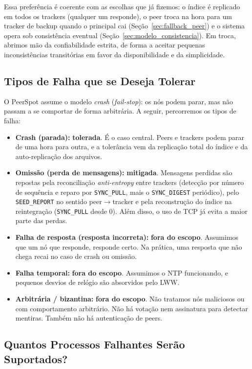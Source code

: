 \documentclass[12pt, a4paper]{article}
\begin{document}
Essa preferência é coerente com as escolhas que já fizemos: o índice é replicado em todos os trackers (qualquer um responde), o peer troca na hora para um tracker de backup quando o principal cai (Seção~\ref{sec:fallback_peer}) e o sistema opera sob consistência eventual (Seção~\ref{sec:modelo_consistencia}). Em troca, abrimos mão da confiabilidade estrita, de forma a aceitar pequenas inconsistências transitórias em favor da disponibilidade e da simplicidade.

\subsection{Tipos de Falha que se Deseja Tolerar}\label{sec:tipos-falha}

O PeerSpot assume o modelo \textit{crash} (\textit{fail-stop}): os nós podem parar, mas não passam a se comportar de forma arbitrária. A seguir, percorremos os tipos de falha:

\begin{itemize}
    \item \textbf{Crash (parada):} \textbf{tolerada}. É o caso central. Peers e trackers podem parar de uma hora para outra, e a tolerância vem da replicação total do índice e da auto-replicação dos arquivos.
    \item \textbf{Omissão (perda de mensagens):} \textbf{mitigada}. Mensagens perdidas são repostas pela reconciliação \textit{anti-entropy} entre trackers (detecção por número de sequência e reparo por \texttt{SYNC\_PULL}, mais o \texttt{SYNC\_DIGEST} periódico), pelo \texttt{SEED\_REPORT} no sentido peer$\rightarrow$tracker e pela reconstrução do índice na reintegração (\texttt{SYNC\_PULL} desde 0). Além disso, o uso de TCP já evita a maior parte das perdas.
    \item \textbf{Falha de resposta (resposta incorreta):} \textbf{fora do escopo}. Assumimos que um nó que responde, responde certo. Na prática, uma resposta que não chega recai no caso de crash ou omissão.
    \item \textbf{Falha temporal:} \textbf{fora do escopo}. Assumimos o NTP funcionando, e pequenos desvios de relógio são absorvidos pelo LWW.
    \item \textbf{Arbitrária / bizantina:} \textbf{fora do escopo}. Não tratamos nós maliciosos ou com comportamento arbitrário. Não há votação nem assinatura para detectar mentiras. Também não há autenticação de peers.
\end{itemize}

\subsection{Quantos Processos Falhantes Serão Suportados?}
\end{document}
